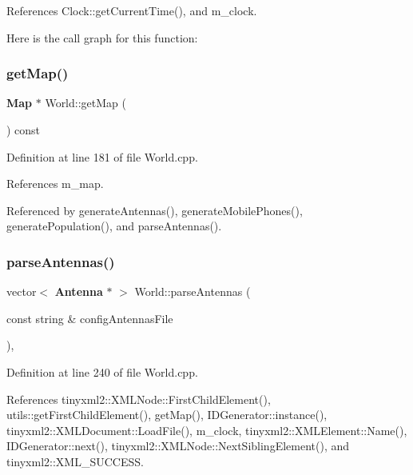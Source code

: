 References Clock\+::get\+Current\+Time(), and m\+\_\+clock.

Here is the call graph for this function\+:
\mbox{\label{class_world_a5b82e6105d8f4b3d757eb7da6d65205a}} 
\subsubsection{get\+Map()}
{\footnotesize\ttfamily \textbf{ Map} $\ast$ World\+::get\+Map (\begin{DoxyParamCaption}{ }\end{DoxyParamCaption}) const}



Definition at line 181 of file World.\+cpp.



References m\+\_\+map.



Referenced by generate\+Antennas(), generate\+Mobile\+Phones(), generate\+Population(), and parse\+Antennas().

\mbox{\label{class_world_aaf31e06b9b5a40a4338164e0f641f7d0}} 
\subsubsection{parse\+Antennas()}
{\footnotesize\ttfamily vector$<$ \textbf{ Antenna} $\ast$ $>$ World\+::parse\+Antennas (\begin{DoxyParamCaption}\item[{const string \&}]{config\+Antennas\+File }\end{DoxyParamCaption})\hspace{0.3cm}{\ttfamily [private]}, {\ttfamily [noexcept]}}



Definition at line 240 of file World.\+cpp.



References tinyxml2\+::\+X\+M\+L\+Node\+::\+First\+Child\+Element(), utils\+::get\+First\+Child\+Element(), get\+Map(), I\+D\+Generator\+::instance(), tinyxml2\+::\+X\+M\+L\+Document\+::\+Load\+File(), m\+\_\+clock, tinyxml2\+::\+X\+M\+L\+Element\+::\+Name(), I\+D\+Generator\+::next(), tinyxml2\+::\+X\+M\+L\+Node\+::\+Next\+Sibling\+Element(), and tinyxml2\+::\+X\+M\+L\+\_\+\+S\+U\+C\+C\+E\+SS.



